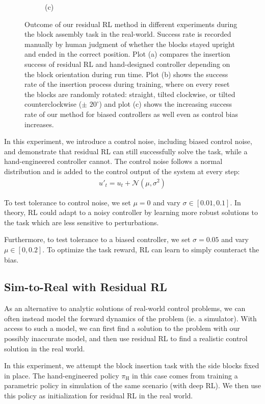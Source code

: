 \begin{figure}[t]
\begin{subfigure}[b]{0.3\linewidth}
        \centering
        (c)
    \end{subfigure}
    \vspace{0.2cm}
    \caption{Outcome of our residual RL method in different experiments during the block assembly task in the real-world. Success rate is recorded manually by human judgment of whether the blocks stayed upright and ended in the correct position. Plot (a) compares the insertion success of residual RL and hand-designed controller depending on the block orientation during run time. Plot (b) shows the success rate of the insertion process during training, where on every reset the blocks are randomly rotated: straight, tilted clockwise, or tilted counterclockwise ($\pm$  $20^{\circ}$) and plot (c) shows the increasing success rate of our method for biased controllers as well even as control bias increases.}%
    \label{fig:environment_variation}
\end{figure}

In this experiment, we introduce a control noise, including biased control noise, and demonstrate that residual RL can still successfully solve the task, while a hand-engineered controller cannot. The control noise follows a normal distribution and is added to the control output of the system at every step:
\begin{align}
    u'_t = u_t + \mathcal{N}(\mu, \sigma^2)
\end{align}

To test tolerance to control noise, we set $\mu = 0$ and vary $\sigma \in [0.01, 0.1]$. In theory, RL could adapt to a noisy controller by learning more robust solutions to the task which are less sensitive to perturbations.

Furthermore, to test tolerance to a biased controller, we set $\sigma = 0.05$ and vary $\mu \in [0, 0.2]$. To optimize the task reward, RL can learn to simply counteract the bias. 

\subsection{Sim-to-Real with Residual RL}

As an alternative to analytic solutions of real-world control problems, we can often instead model the forward dynamics of the problem (ie. a simulator). With access to such a model, we can first find a solution to the problem with our possibly inaccurate model, and then use residual RL to find a realistic control solution in the real world.

In this experiment, we attempt the block insertion task with the side blocks fixed in place. The hand-engineered policy $\pi_\text{H}$ in this case comes from training a parametric policy in simulation of the same scenario (with deep RL). We then use this policy as initialization for residual RL in the real world.